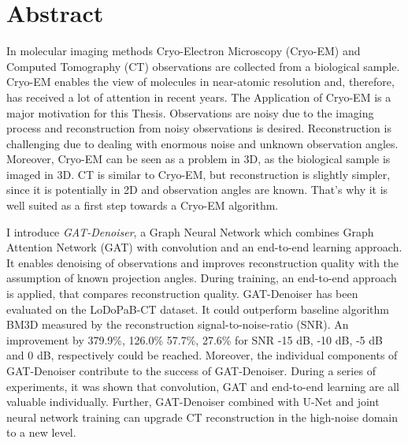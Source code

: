 \chapter{Abstract}


In molecular imaging methods Cryo-Electron Microscopy (Cryo-EM) and Computed Tomography (CT)
observations are collected from a biological sample. 
Cryo-EM enables the view of molecules in near-atomic resolution and, therefore, has received
a lot of attention in recent years.
The Application of Cryo-EM is a major motivation for this Thesis. 
Observations are noisy due to the imaging process and reconstruction from noisy observations is desired.
Reconstruction is challenging due to dealing with enormous noise and unknown observation angles.
Moreover, Cryo-EM can be seen as a problem in 3D, as the biological sample is imaged in 3D.
CT is similar to Cryo-EM, but reconstruction is slightly simpler, since it is potentially in 2D and 
observation angles are known.
That's why it is well suited as a first step towards a Cryo-EM algorithm.

I introduce \textit{GAT-Denoiser}, a Graph Neural Network which combines Graph Attention Network (GAT) with convolution 
and an end-to-end learning approach. 
It enables denoising of observations and improves reconstruction quality with the assumption of known projection angles.
During training, an end-to-end approach is applied, that compares reconstruction quality.
GAT-Denoiser has been evaluated on the LoDoPaB-CT dataset.
It could outperform baseline algorithm BM3D measured by the reconstruction
signal-to-noise-ratio (SNR). An improvement by 379.9\%, 126.0\% 57.7\%, 27.6\% for SNR -15 dB, -10 dB, -5 dB and 0 dB, respectively
could be reached.
Moreover, the individual components of GAT-Denoiser contribute to the success of GAT-Denoiser.
During a series of experiments, it was shown that convolution, GAT and end-to-end learning are all valuable individually.
Further, GAT-Denoiser combined with U-Net and joint neural network training can upgrade CT reconstruction in the high-noise domain to a new level. 

